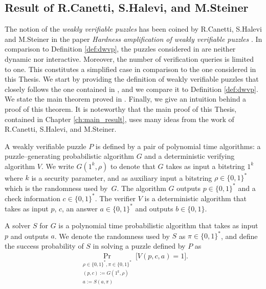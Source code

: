 \documentclass[11pt,a4paper,titlepage]{memoir}
\begin{document}
\subsection{Result of R.Canetti, S.Halevi, and M.Steiner}
The notion of the \textit{weakly verifiable puzzles} has been coined by R.Canetti, S.Halevi and M.Steiner in the paper
\textit{Hardness amplification of weakly verifiable puzzles} \cite{canetti2004hardness}.
In comparison to Definition \ref{def:dwvp}, the puzzles considered in \cite{canetti2004hardness} are neither dynamic nor interactive.
Moreover, the number of verification queries is limited to one.
This constitutes a simplified case in comparison to the one considered in this Thesis.
We start by providing the definition of weakly verifiable puzzles that closely follows the one contained in \cite{canetti2004hardness}, and
we compare it to Definition \ref{def:dwvp}.
We state the main theorem proved in \cite{canetti2004hardness}.
Finally, we give an intuition behind a proof of this theorem.
It is noteworthy that the main proof of this Thesis, contained in Chapter \ref{ch:main_result}, uses many ideas from the work of R.Canetti, S.Halevi, and M.Steiner.
%
\begin{definition}
  \label{def:wvp}
A \textnormal{weakly verifiable puzzle} $P$ is defined by a pair of polynomial time algorithms:
a puzzle--generating probabilistic algorithm $G$ and a deterministic verifying algorithm $V$.
We write $G(1^k, \rho)$ to denote that $G$ takes as input a bitstring $1^k$ where $k$ is a security parameter,
and as auxiliary input a bitstring $\rho \in \{0,1\}^{*}$ which is the randomness used by~$G$.
The algorithm $G$ outputs $p \in \{0,1\}^{*}$ and a check information $c \in \{0,1\}^{*}$.
The \textnormal{verifier} $V$ is a deterministic algorithm that takes as input $p$, $c$, an answer $a \in \{0,1\}^{*}$
and outputs $b \in \{0,1\}$.

A \textnormal{solver} $S$ for $G$ is a polynomial time probabilistic algorithm that
takes as input $p$ and outputs $a$. We denote the randomness used by $S$ as $\pi \in \{0,1\}^{*}$,
and define the \textnormal{success probability} of $S$ in solving a puzzle defined by $P$ as
\begin{align*}
  \underset{\substack{\rho \in \{0,1\}^{*}, \pi \in \{0,1\}^{*} \\ (p,c):=G(1^k, \rho) \\ a := S(a,\pi)}}{\Pr}\Big[ V(p,c,a) = 1\Big].
\end{align*}
\end{definition}
\end{document}
